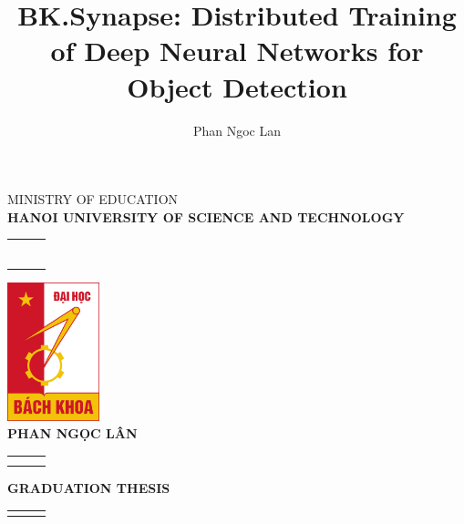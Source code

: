 \documentclass[a4paper,12pt]{report}
\title{BK.Synapse: Distributed Training of Deep Neural Networks for Object Detection}
\author{Phan Ngoc Lan}
\begin{document}
\thispagestyle{empty}
\thisfancypage{
\setlength{\fboxrule}{1pt}
\doublebox}{}

\begin{center}
    {\fontsize{12}{19}\selectfont MINISTRY OF EDUCATION\\
     \textbf{HANOI UNIVERSITY OF SCIENCE AND TECHNOLOGY}}\\
     \begin{tabular}{lll}
    
    &   &                   \\
    &   &                   \\
    &   &                   \\
    &   &                   \\
    &   &                   \\
    &   &                   \\
    
    \end{tabular}
    
    \includegraphics[width=0.2\textwidth]{hust.jpeg}\\[1.3cm]
    {\fontsize{12}{43}\selectfont \textbf{PHAN NGỌC LÂN} }\\[0.1cm]
     \begin{tabular}{lll}
    
    &   &                   \\
    &   &                   \\
    
    \end{tabular}

    {\fontsize{12}{10}\selectfont \textbf{GRADUATION THESIS} }\\[0.1cm]

    \begin{tabular}{lll}
    &   &                   \\
    \end{tabular}
    

\end{center}
\end{document}
